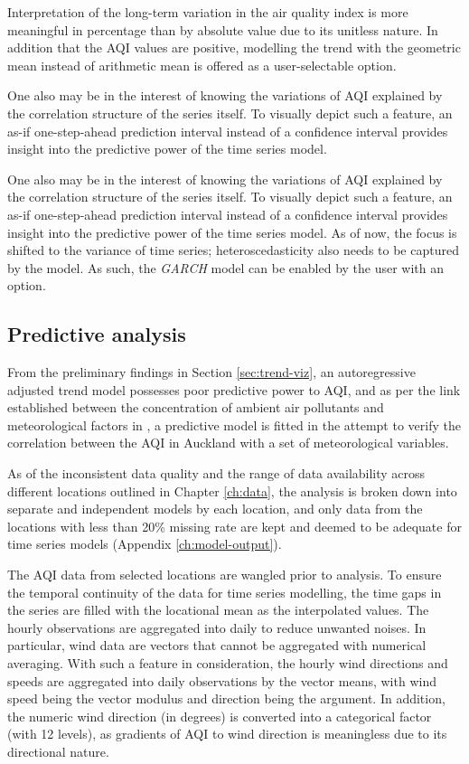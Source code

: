 \documentclass{aucklandthesis}
\begin{document}
Interpretation of the long-term variation in the air quality index is more meaningful in percentage than by absolute value due to its unitless nature. In addition that the AQI values are positive, modelling the trend with the geometric mean instead of arithmetic mean is offered as a user-selectable option.

One also may be in the interest of knowing the variations of AQI explained by the correlation structure of the series itself. To visually depict such a feature, an as-if one-step-ahead prediction interval instead of a confidence interval provides insight into the predictive power of the time series model.

One also may be in the interest of knowing the variations of AQI explained by the correlation structure of the series itself. To visually depict such a feature, an as-if one-step-ahead prediction interval instead of a confidence interval provides insight into the predictive power of the time series model. As of now, the focus is shifted to the variance of time series; heteroscedasticity also needs to be captured by the model. As such, the \emph{GARCH} model can be enabled by the user with an option.

\hypertarget{predictive-analysis}{%
\subsection{Predictive analysis}\label{predictive-analysis}}

From the preliminary findings in Section \ref{sec:trend-viz}, an autoregressive adjusted trend model possesses poor predictive power to AQI, and as per the link established between the concentration of ambient air pollutants and meteorological factors in \textcite{wind}, a predictive model is fitted in the attempt to verify the correlation between the AQI in Auckland with a set of meteorological variables.

As of the inconsistent data quality and the range of data availability across different locations outlined in Chapter \ref{ch:data}, the analysis is broken down into separate and independent models by each location, and only data from the locations with less than 20\% missing rate are kept and deemed to be adequate for time series models (Appendix \ref{ch:model-output}).

The AQI data from selected locations are wangled prior to analysis. To ensure the temporal continuity of the data for time series modelling, the time gaps in the series are filled with the locational mean as the interpolated values. The hourly observations are aggregated into daily to reduce unwanted noises. In particular, wind data are vectors that cannot be aggregated with numerical averaging. With such a feature in consideration, the hourly wind directions and speeds are aggregated into daily observations by the vector means, with wind speed being the vector modulus and direction being the argument. In addition, the numeric wind direction (in degrees) is converted into a categorical factor (with 12 levels), as gradients of AQI to wind direction is meaningless due to its directional nature.
\end{document}
